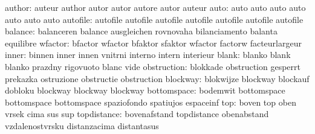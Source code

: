                    author: auteur                    author
                           autor                     autor
                           autore                    autor
                           auteur
                     auto: auto                      auto
                           auto                      auto
                           auto                      auto
                           auto
                 autofile: autofile                  autofile
                           autofile                  autofile
                           autofile                  autofile
                           autofile %
                  balance: balanceren                balance
                           ausgleichen               rovnovaha
                           bilanciamento             balanta
                           equilibre
                  wfactor: bfactor                   wfactor
                           bfaktor                   sfaktor
                           wfactor                   factorw
                           facteurlargeur
                    inner: binnen                    inner
                           innen                     vnitrni
                           interno                   intern
                           interieur
                    blank: blanko                    blank
                           blanko                    prazdny
                           rigovuoto                 blanc
                           vide
              obstruction: blokkade                  obstruction
                           gesperrt                  prekazka
                           ostruzione                obstructie
                           obstruction
                 blockway: blokwijze                 blockway
                           blockauf                  dobloku
                           blockway                  blockway
                           blockway
              bottomspace: bodemwit                  bottomspace
                           bottomspace               bottomspace
                           spaziofondo               spatiujos
                           espaceinf
                      top: boven                     top
                           oben                      vrsek
                           cima                      sus
                           sup
              topdistance: bovenafstand              topdistance
                           obenabstand               vzdalenostvrsku
                           distanzacima              distantasus

